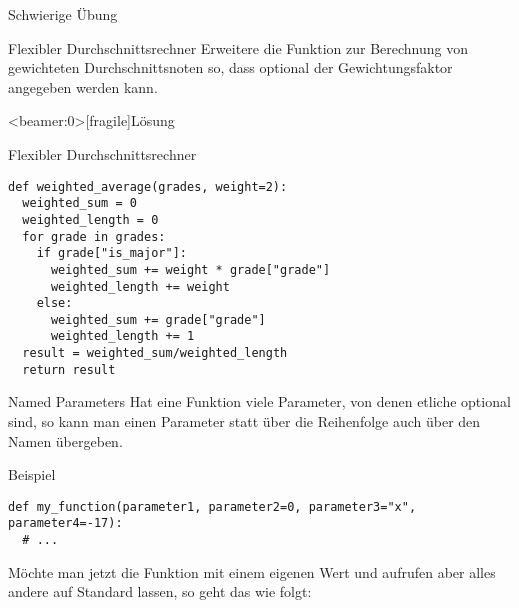 \begin{frame}{Schwierige Übung}

\begin{block}{Flexibler Durchschnittsrechner}
\vspace{2pt}
Erweitere die Funktion zur Berechnung von gewichteten Durchschnittsnoten so, dass optional der Gewichtungsfaktor angegeben werden kann. 	
\end{block}

\end{frame}

\begin{frame}<beamer:0>[fragile]{Lösung}

\begin{solutionblock}{Flexibler Durchschnittsrechner}
\begin{verbatim}
def weighted_average(grades, weight=2): 
  weighted_sum = 0
  weighted_length = 0
  for grade in grades: 
    if grade["is_major"]: 
      weighted_sum += weight * grade["grade"]
      weighted_length += weight
    else:
      weighted_sum += grade["grade"]
      weighted_length += 1
  result = weighted_sum/weighted_length
  return result 
\end{verbatim}
\end{solutionblock}

\end{frame}

\begin{fragile}
	
\begin{block}{Named Parameters}
\vspace{2pt}
Hat eine Funktion viele Parameter, von denen etliche optional sind, so kann man einen Parameter statt über die Reihenfolge auch über den Namen übergeben. 
\end{block}

\pause 
\vspace{12pt}

\begin{exampleblock}{Beispiel}
\vspace{2pt}

\begin{verbatim}
def my_function(parameter1, parameter2=0, parameter3="x", parameter4=-17):
  # ... 
\end{verbatim}
Möchte man jetzt die Funktion mit einem eigenen Wert  und  aufrufen aber alles andere auf Standard lassen, so geht das wie folgt: 

\end{exampleblock}

	
\end{fragile}



